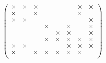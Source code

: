 $$
	\left(\begin{array}{cccccccc}
    \times &  \times   &  \times  &          &          &        &   \times &   \times \\
    \times &           &  \times  &          &          &        &   \times &          \\ 
    \times &  \times   &          &          &          &        &          &   \times \\
           &           &          &   \times &          & \times &          &   \times \\ 
           &           &          &          &  \times  & \times &          &   \times \\ 
           &           &          &   \times &  \times  & \times &   \times &   \times \\ 
    \times &  \times   &          &          &          & \times &   \times &   \times \\ 
    \times &           &  \times  &   \times &  \times  & \times &   \times &          \\ 
	\end{array}\right)
$$

\begin{funders}
\end{funders}
